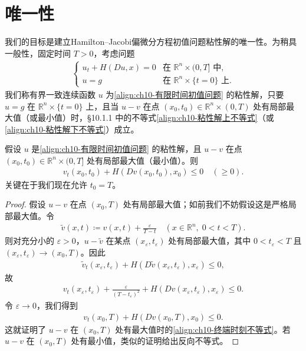 \documentclass[../../main.tex]{subfiles}
\begin{document}
\section{唯一性}\label{section:ch10-唯一性}

我们的目标是建立Hamilton--Jacobi偏微分方程初值问题粘性解的唯一性。为稍具一般性，固定时间 $T>0$，考虑问题
\begin{align}
\begin{cases}
u_t+H(Du,x)=0 & \text{在 } \mathbb{R}^n\times(0,T] \text{ 中},\\
u=g & \text{在 } \mathbb{R}^n\times\{t=0\} \text{ 上}.
\end{cases}
\label{align:ch10-有限时间初值问题}
\end{align}
我们称有界一致连续函数 $u$ 为\eqref{align:ch10-有限时间初值问题} 的粘性解，只要 $u=g$ 在 $\mathbb{R}^n\times\{t=0\}$ 上，且当 $u-v$ 在点 $(x_0,t_0)\in\mathbb{R}^n\times(0,T)$ 处有局部最大值（或最小值）时，\S10.1.1 中的不等式\eqref{align:ch10-粘性解上不等式}（或\eqref{align:ch10-粘性解下不等式}）成立。

\begin{lemma}[终端时刻的极值。]\label{lemma:ch10-终端时刻极值}假设 $u$ 是\eqref{align:ch10-有限时间初值问题} 的粘性解，且 $u-v$ 在点 $(x_0,t_0)\in\mathbb{R}^n\times(0,T]$ 处有局部最大值（最小值）。则
\begin{align}
v_t(x_0,t_0)+H(Dv(x_0,t_0),x_0)\leqslant 0 \quad (\geqslant 0).
\label{align:ch10-终端时刻不等式}
\end{align}
关键在于我们现在允许 $t_0=T$。
\end{lemma}

\begin{proof}
假设 $u-v$ 在点 $(x_0,T)$ 处有局部最大值；如前我们不妨假设这是严格局部最大值。令
\begin{align*}
\widetilde{v}(x,t)\coloneqq v(x,t)+\frac{\varepsilon}{T-t}\quad (x\in\mathbb{R}^n,\;0<t<T).
\end{align*}
则对充分小的 $\varepsilon>0$，$u-\widetilde{v}$ 在某点 $(x_\varepsilon,t_\varepsilon)$ 处有局部最大值，其中 $0<t_\varepsilon<T$ 且 $(x_\varepsilon,t_\varepsilon)\to(x_0,T)$。因此
\begin{align*}
\widetilde{v}_t(x_\varepsilon,t_\varepsilon)+H(D\widetilde{v}(x_\varepsilon,t_\varepsilon),x_\varepsilon)\leqslant 0,
\end{align*}
故
\begin{align*}
v_t(x_\varepsilon,t_\varepsilon)+\frac{\varepsilon}{(T-t_\varepsilon)^2}+H(Dv(x_\varepsilon,t_\varepsilon),x_\varepsilon)\leqslant 0.
\end{align*}
令 $\varepsilon\to 0$，我们得到
\begin{align*}
v_t(x_0,T)+H(Dv(x_0,T),x_0)\leqslant 0.
\end{align*}
这就证明了 $u-v$ 在 $(x_0,T)$ 处有最大值时的\eqref{align:ch10-终端时刻不等式}。若 $u-v$ 在 $(x_0,T)$ 处有最小值，类似的证明给出反向不等式。
\end{proof}
\end{document}
